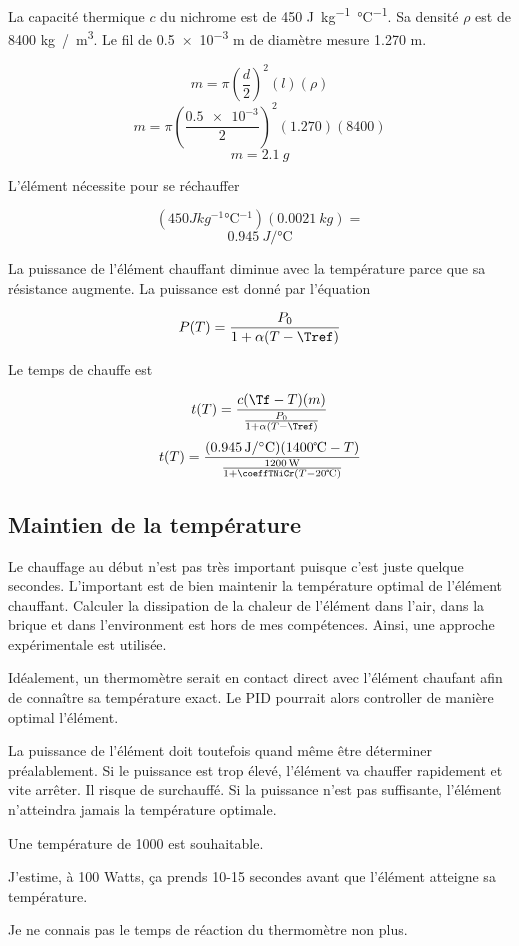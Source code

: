 \documentclass{article}
\begin{document}
\newcommand{\uniteCapaciteThermique}{\si{J kg^{-1} \celsius^{-1}}}
La capacité thermique $c$ du nichrome est de 450 \uniteCapaciteThermique. Sa densité $\rho$ est de 8400 \si{kg / m^3}. Le fil de \num{0.5e-3} m de diamètre mesure 1.270 m.

\[m = \pi(\frac{d}{2})^2(l)(\rho)\]
\[m = \pi(\frac{\num{0.5e-3}}{2})^2(1.270)(8400)\]
\[m = \SI{2.1}{g}\]

L'élément nécessite pour se réchauffer

\[(450 \uniteCapaciteThermique)(\SI{0.0021}{kg}) = \]
\[\boxed{\SI{0.945}{J/\celsius}}\]

La puissance de l'élément chauffant diminue avec la température parce que sa résistance augmente. La puissance est donné par l'équation

\[P(T) = \frac{P_0}{1+\alpha(T-\Tref)}\]

\var{}
Le temps de chauffe est

\[t(T) = \frac{c(\Tf-T)(m)}{\frac{P_0}{1+\alpha(T-\Tref)}}\]
\[t(T) = \frac{(\SI{0.945}{J/\celsius})(1400\celsius-T)}{\frac{\SI{1200}{W}}{1+\coeffTNiCr(T-20\celsius)}}\]

\subsection{Maintien de la température}

Le chauffage au début n'est pas très important puisque c'est juste quelque secondes. L'important est de bien maintenir la température optimal de l'élément chauffant. Calculer la dissipation de la chaleur de l'élément dans l'air, dans la brique et dans l'environment est hors de mes compétences. Ainsi, une approche expérimentale est utilisée.

Idéalement, un thermomètre serait en contact direct avec l'élément chaufant afin de connaître sa température exact. Le PID pourrait alors controller de manière optimal l'élément.

La puissance de l'élément doit toutefois quand même être déterminer préalablement. Si le puissance est trop élevé, l'élément va chauffer rapidement et vite arrêter. Il risque de surchauffé. Si la puissance n'est pas suffisante, l'élément n'atteindra jamais la température optimale.

Une température de 1000 \celsius est souhaitable.

J'estime, à 100 Watts, ça prends 10-15 secondes avant que l'élément atteigne sa température.

Je ne connais pas le temps de réaction du thermomètre non plus.
\end{document}
